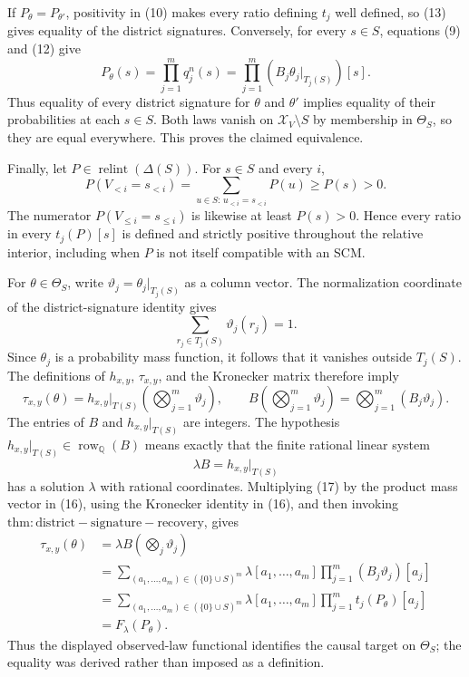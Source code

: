 If \(P_\theta=P_{\theta'}\), positivity in (10) makes every ratio defining \(t_j\) well defined, so (13) gives equality of the district signatures.  Conversely, for every \(s\in S\), equations (9) and (12) give
\[
P_\theta(s)=\prod_{j=1}^m q_j^n(s)
=\prod_{j=1}^m(B_j\theta_j|_{T_j(S)})[s].                    \tag{14}
\]
Thus equality of every district signature for \(\theta\) and \(\theta'\) implies equality of their probabilities at each \(s\in S\).  Both laws vanish on \(\mathcal X_V\setminus S\) by membership in \(\Theta_S\), so they are equal everywhere.  This proves the claimed equivalence.

Finally, let \(P\in\operatorname{relint}(\Delta(S))\).  For \(s\in S\) and every \(i\),
\[
P(V_{<i}=s_{<i})
=\sum_{u\in S:\,u_{<i}=s_{<i}}P(u)
\ge P(s)>0.                                                    \tag{15}
\]
The numerator \(P(V_{\le i}=s_{\le i})\) is likewise at least \(P(s)>0\).  Hence every ratio in every \(t_j(P)[s]\) is defined and strictly positive throughout the relative interior, including when \(P\) is not itself compatible with an SCM.

For \(\theta\in\Theta_S\), write \(\vartheta_j=\theta_j|_{T_j(S)}\) as a column vector.  The normalization coordinate of the district-signature identity gives
\[
\sum_{r_j\in T_j(S)}\vartheta_j(r_j)=1.
\]
Since \(\theta_j\) is a probability mass function, it follows that it vanishes outside \(T_j(S)\).  The definitions of \(h_{x,y}\), \(\tau_{x,y}\), and the Kronecker matrix therefore imply
\[
\tau_{x,y}(\theta)
=h_{x,y}|_{T(S)}\left(\bigotimes_{j=1}^m\vartheta_j\right),
\qquad
B\left(\bigotimes_{j=1}^m\vartheta_j\right)
=\bigotimes_{j=1}^m(B_j\vartheta_j).                          \tag{16}
\]
The entries of \(B\) and \(h_{x,y}|_{T(S)}\) are integers.  The hypothesis
\(h_{x,y}|_{T(S)}\in\operatorname{row}_{\mathbb Q}(B)\) means exactly that the finite rational linear system
\[
\lambda B=h_{x,y}|_{T(S)}                                    \tag{17}
\]
has a solution \(\lambda\) with rational coordinates.  Multiplying (17) by the product mass vector in (16), using the Kronecker identity in (16), and then invoking \(\mathrm{thm:district-signature-recovery}\), gives
\[
\begin{aligned}
\tau_{x,y}(\theta)
&=\lambda B\left(\bigotimes_j\vartheta_j\right)\\
&=\sum_{(a_1,\ldots,a_m)\in(\{0\}\cup S)^m}
  \lambda[a_1,\ldots,a_m]\prod_{j=1}^m(B_j\vartheta_j)[a_j]\\
&=\sum_{(a_1,\ldots,a_m)\in(\{0\}\cup S)^m}
  \lambda[a_1,\ldots,a_m]\prod_{j=1}^m t_j(P_\theta)[a_j]\\
&=F_\lambda(P_\theta).                                       \tag{18}
\end{aligned}
\]
Thus the displayed observed-law functional identifies the causal target on \(\Theta_S\); the equality was derived rather than imposed as a definition.

